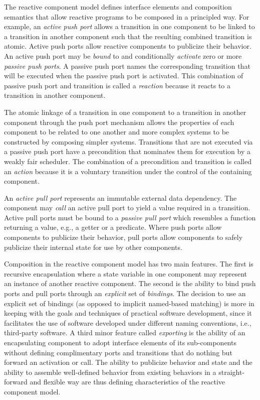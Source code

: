 
The reactive component model defines interface elements and composition semantics that allow reactive programs to be composed in a principled way.
For example, an \emph{active push port} allows a transition in one component to be linked to a transition in another component such that the resulting combined transition is atomic.
Active push ports allow reactive components to publicize their behavior.
An active push port may be \emph{bound} to and conditionally \emph{activate} zero or more \emph{passive push ports}.
A passive push port names the corresponding transition that will be executed when the passive push port is activated.
This combination of passive push port and transition is called a \emph{reaction} because it reacts to a transition in another component.

The atomic linkage of a transition in one component to a transition in another component through the push port mechanism allows the properties of each component to be related to one another and more complex systems to be constructed by composing simpler systems.
Transitions that are not executed via a passive push port have a precondition that nominates them for execution by a weakly fair scheduler.
The combination of a precondition and transition is called an \emph{action} because it is a voluntary transition under the control of the containing component.

An \emph{active pull port} represents an immutable external data dependency.
The component may \emph{call} an active pull port to yield a value required in a transition.
Active pull ports must be bound to a \emph{passive pull port} which resembles a function returning a value, e.g., a getter or a predicate.
Where push ports allow components to publicize their behavior, pull ports allow components to safely publicize their internal state for use by other components.

Composition in the reactive component model has two main features.
The first is recursive encapsulation where a state variable in one component may represent an instance of another reactive component.
The second is the ability to bind push ports and pull ports through an \emph{explicit} set of \emph{bindings}.
The decision to use an explicit set of bindings (as opposed to implicit named-based matching) is more in keeping with the goals and techniques of practical software development, since it facilitates the use of software developed under different naming conventions, i.e., third-party software.
A third minor feature called \emph{exporting} is the ability of an encapsulating component to adopt interface elements of its sub-components without defining complimentary ports and transitions that do nothing but forward an activation or call.
The ability to publicize behavior and state and the ability to assemble well-defined behavior from existing behaviors in a straight-forward and flexible way are thus defining characteristics of the reactive component model.


